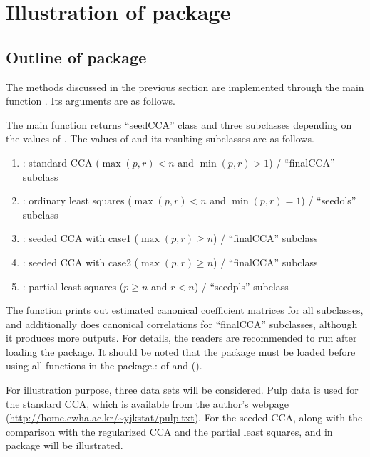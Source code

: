 \section{Illustration of  package}
\subsection{Outline of  package}
The methods discussed in the previous section are
implemented through the main function .
Its arguments are as follows.
\vspace{5mm}

\noindent{}
\vspace{5mm}

The main function  returns ``seedCCA'' class and
three subclasses depending on the values of .
The values of  and its resulting subclasses are as follows.
%
\begin{enumerate}
\item[]: standard CCA ($\max(p,r)<n$ and $\min(p,r) >1$)
/ ``finalCCA'' subclass

\item[]: ordinary least squares ($\max(p,r)<n$ and $\min(p,r)=1$)
/ ``seedols'' subclass

\item[]: seeded CCA with case1 ($\max(p,r)\geq n$)
/ ``finalCCA'' subclass

\item[]: seeded CCA with case2 ($\max(p,r)\geq n$)
/ ``finalCCA'' subclass

\item[]: partial least squares ($p \geq n$ and $r <n$)
/ ``seedpls'' subclass
\end{enumerate}
%
The function  prints out estimated canonical coefficient matrices
for all subclasses, and additionally does canonical correlations for ``finalCCA'' subclasses,
although it produces more outputs.
For details, the readers are recommended to run 
after loading the  package.
It should be noted that the  package must be loaded
before using all functions in the package.:  of
 and  (\cite{corpcor}).

For illustration purpose, three data sets will be considered.
Pulp data is used for the standard CCA,
which is available from the author's webpage
(\url{http://home.ewha.ac.kr/~yjkstat/pulp.txt}).
For the seeded CCA, along with the comparison with the regularized CCA
and the partial least squares,
 and  in  package
will be illustrated.

